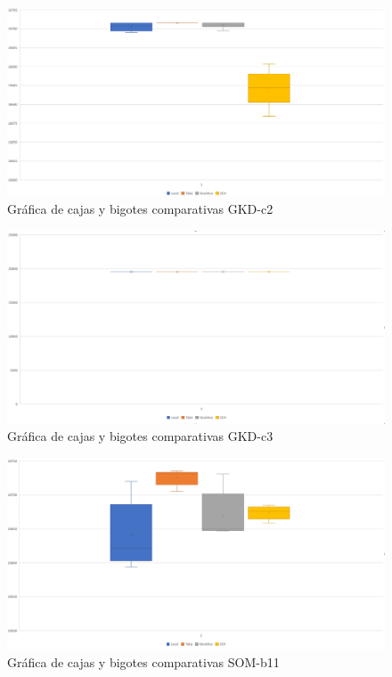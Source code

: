	\begin{figure}[H]
		\centering
		\includegraphics[scale=0.3]{img/finalGKD2.png}
		\caption{Gráfica de cajas y bigotes comparativas GKD-c2}
		\label{GKD-c2_final}
	\end{figure}

	\begin{figure}[H]
		\centering
		\includegraphics[scale=0.3]{img/finalGKD3.png}
		\caption{Gráfica de cajas y bigotes comparativas GKD-c3}
		\label{GKD-c3_final}
	\end{figure}

	\begin{figure}[H]
		\centering
		\includegraphics[scale=0.3]{img/finalSOM1.png}
		\caption{Gráfica de cajas y bigotes comparativas SOM-b11}
		\label{SOM-b11_final}
	\end{figure}

